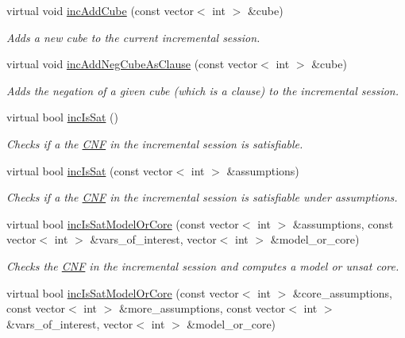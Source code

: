\begin{DoxyCompactItemize}
virtual void \hyperlink{classLingelingApi_a6dc0eb0582d6afda381fc05a5820433c}{inc\-Add\-Cube} (const vector$<$ int $>$ \&cube)
\begin{DoxyCompactList}\small\item\em Adds a new cube to the current incremental session. \end{DoxyCompactList}\item 
virtual void \hyperlink{classLingelingApi_afefd24f97e49aed7cbaf25140a6b7741}{inc\-Add\-Neg\-Cube\-As\-Clause} (const vector$<$ int $>$ \&cube)
\begin{DoxyCompactList}\small\item\em Adds the negation of a given cube (which is a clause) to the incremental session. \end{DoxyCompactList}\item 
virtual bool \hyperlink{classLingelingApi_a7a96e3b1078e40305f8b5e329f0a1e26}{inc\-Is\-Sat} ()
\begin{DoxyCompactList}\small\item\em Checks if a the \hyperlink{classCNF}{C\-N\-F} in the incremental session is satisfiable. \end{DoxyCompactList}\item 
virtual bool \hyperlink{classLingelingApi_a192ddd0f1d27617570c759b3496ea90d}{inc\-Is\-Sat} (const vector$<$ int $>$ \&assumptions)
\begin{DoxyCompactList}\small\item\em Checks if a the \hyperlink{classCNF}{C\-N\-F} in the incremental session is satisfiable under assumptions. \end{DoxyCompactList}\item 
virtual bool \hyperlink{classLingelingApi_a5f70806ab80cb622f4f7286f66284c4e}{inc\-Is\-Sat\-Model\-Or\-Core} (const vector$<$ int $>$ \&assumptions, const vector$<$ int $>$ \&vars\-\_\-of\-\_\-interest, vector$<$ int $>$ \&model\-\_\-or\-\_\-core)
\begin{DoxyCompactList}\small\item\em Checks the \hyperlink{classCNF}{C\-N\-F} in the incremental session and computes a model or unsat core. \end{DoxyCompactList}\item 
virtual bool \hyperlink{classLingelingApi_a95680a60e64dccddbe007ef7d4c8a960}{inc\-Is\-Sat\-Model\-Or\-Core} (const vector$<$ int $>$ \&core\-\_\-assumptions, const vector$<$ int $>$ \&more\-\_\-assumptions, const vector$<$ int $>$ \&vars\-\_\-of\-\_\-interest, vector$<$ int $>$ \&model\-\_\-or\-\_\-core)

\end{DoxyCompactItemize}
